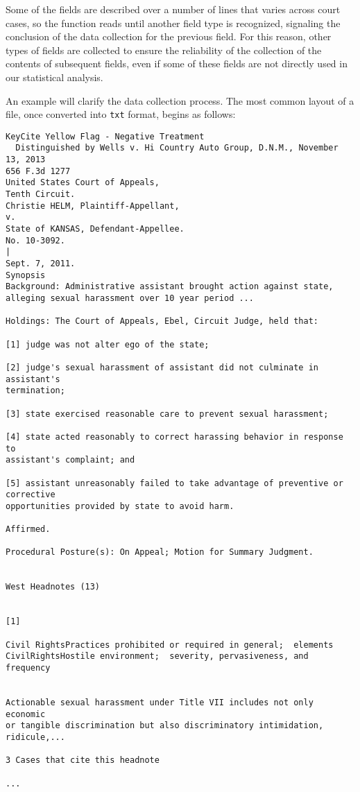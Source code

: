 \documentclass[11pt]{paper}
\begin{document}
Some of the fields are described over a number of lines that varies across 
court cases, so the function reads until another field type is recognized, 
signaling the conclusion of the data collection for the previous field. 
For this reason, other types of fields are collected to ensure the reliability 
of the collection of the contents of subsequent fields, even if some of these 
fields are not directly used in our statistical analysis. 

An example will clarify the data collection process. 
The most common layout of a file, once converted into \texttt{txt} format, 
begins as follows:

\begin{verbatim}
KeyCite Yellow Flag - Negative Treatment
  Distinguished by Wells v. Hi Country Auto Group, D.N.M., November 13, 2013
656 F.3d 1277
United States Court of Appeals,
Tenth Circuit.
Christie HELM, Plaintiff-Appellant,
v.
State of KANSAS, Defendant-Appellee.
No. 10-3092.
|
Sept. 7, 2011.
Synopsis
Background: Administrative assistant brought action against state, 
alleging sexual harassment over 10 year period ...

Holdings: The Court of Appeals, Ebel, Circuit Judge, held that:
 
[1] judge was not alter ego of the state;

[2] judge's sexual harassment of assistant did not culminate in assistant's 
termination;
 
[3] state exercised reasonable care to prevent sexual harassment;
 
[4] state acted reasonably to correct harassing behavior in response to 
assistant's complaint; and
 
[5] assistant unreasonably failed to take advantage of preventive or corrective 
opportunities provided by state to avoid harm.
 
Affirmed.
 
Procedural Posture(s): On Appeal; Motion for Summary Judgment.


West Headnotes (13)


[1]

Civil RightsPractices prohibited or required in general;  elements
CivilRightsHostile environment;  severity, pervasiveness, and frequency


Actionable sexual harassment under Title VII includes not only economic 
or tangible discrimination but also discriminatory intimidation, ridicule,...

3 Cases that cite this headnote

...

\end{verbatim}
\end{document}
